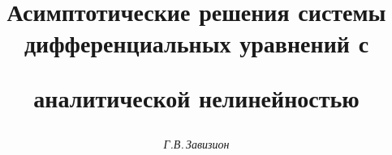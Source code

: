 

 


%  


 


\newcommand{\diag}{\operatorname{diag}} 


\newcommand{\tts}[1]{} 


 




\setcounter{page}{53} 












 


\author{\it Г.В.\,Завизион} 




\title{Асимптотические решения системы дифференциальных уравнений с


аналитической нелинейностью} 


 


\date{} 




\pagestyle{plain} %


 




\maketitle 


\label{begin} 











